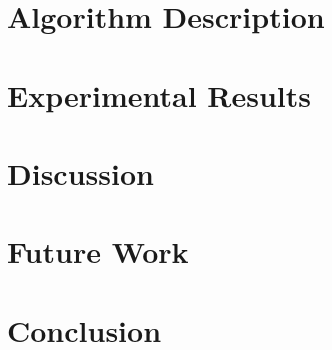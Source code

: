 \documentclass[conference,onecolumn]{IEEEtran}
\begin{document}
\section{Algorithm Description}

\FloatBarrier

\section{Experimental Results}

\FloatBarrier
\section{Discussion}

\FloatBarrier
\section{Future Work}

\FloatBarrier
\section{Conclusion}

\FloatBarrier



\end{document}
